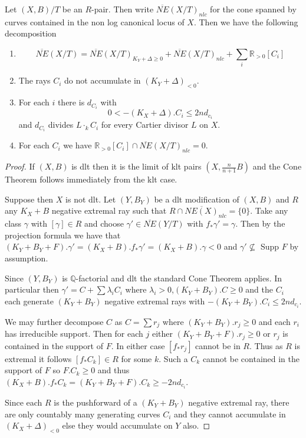 	\begin{theorem}\label{NLCT}
	Let $(X,B)/T$ be an $R$-pair. Then write $\overline{NE}(X/T)_{nlc}$ for the cone spanned by curves contained in the non log canonical locus of $X$. Then we have the following decomposition
	
		\begin{enumerate}
		\item $$\overline{NE}(X/T)=\overline{NE}(X/T)_{K_{Y}+\Delta \geq 0} +\overline{NE}(X/T)_{nlc}+ \sum_{i} \mathbb{R}_{>0}[C_{i}]$$
		\item The rays $C_{i}$ do not accumulate in $(K_{Y}+\Delta)_{<0}$.
		\item For each $i$ there is $d_{C_{i}}$ with 
		\[0 < -(K_{X}+\Delta).C_{i} \leq 2nd_{c_{i}}\]
		and $d_{C_{i}}$ divides $L\cdot_{k}C_{i}$ for every Cartier divisor $L$ on $X$.
		\item For each $C_{i}$ we have $\mathbb{R}_{>0}[C_{i}] \cap \overline{NE}(X/T)_{nlc} = {0}$.
	\end{enumerate}

	
\end{theorem}
\begin{proof}
	If $(X,B)$ is dlt then it is the limit of klt pairs $(X,\frac{n}{n+1}B)$ and the Cone Theorem follows immediately from the klt case.
	
	Suppose then $X$ is not dlt. Let $(Y,B_{Y})$ be a dlt modification of $(X,B)$ and $R$ any $K_{X}+B$ negative extremal ray such that $R \cap\overline{NE(X)}_{nlc}=\{0\}$. Take any class $\gamma$ with $[\gamma] \in R$ and choose $\gamma' \in \overline{NE}(Y/T)$ with $f_{*}\gamma'=\gamma$. Then by the projection formula we have that $(K_{Y}+B_{Y}+F).\gamma'=(K_{X}+B).f_{*}\gamma'=(K_{X}+B).\gamma < 0$ and $\gamma' \not\subseteq$ Supp $F$ by assumption. 

	Since $(Y,B_{Y})$ is $\mathbb{Q}$-factorial and dlt the standard Cone Theorem applies. In particular then $\gamma'=C+ \sum \lambda_{i}C_{i}$ where $\lambda_{i} >0$,$(K_{Y}+B_{Y}).C \geq 0$ and the $C_{i}$ each generate $(K_{Y}+B_{Y})$ negative extremal rays with $-(K_{Y}+B_{Y}).C_{i} \leq 2nd_{c_{i}}$. 
	
	We may further decompose $C$ as $C=\sum r_{j}$ where $(K_{Y}+B_{Y}).r_{j} \geq 0$ and each $r_{i}$ has irreducible support. Then for each $j$ either $(K_{Y}+B_{Y}+F).r_{j} \geq 0$ or $r_{j}$ is contained in the support of $F$. In either case $[f_{*}r_{j}]$ cannot be in $R$. Thus as $R$ is extremal it follows $[f_{*}C_{k}] \in R$ for some $k$. Such a $C_{k}$ cannot be contained in the support of $F$ so $F.C_{k} \geq 0$ and thus $(K_{X}+B).f_{*}C_{k}=(K_{Y}+B_{Y}+F).C_{k} \geq -2nd_{c_{i}}$.
	
	Since each $R$ is the pushforward of a $(K_{Y}+B_{Y})$ negative extremal ray, there are only countably many generating curves $C_{i}$ and they cannot accumulate in $(K_{X}+\Delta)_{< 0}$ else they would accumulate on $Y$ also.
\end{proof}


